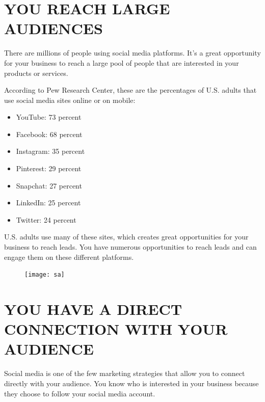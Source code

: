 \documentclass[a4paper]{article}
\begin{document}
 \cleardoublepage
  
  \tableofcontents
  \thispagestyle{empty}
  \cleardoublepage
  
  \setcounter{page}{1}  
  
  \section{ YOU REACH LARGE AUDIENCES}
There are millions of people using social media platforms. It’s a great opportunity for your business to reach a large pool of people that are interested in your products or services.

According to Pew Research Center, these are the percentages of U.S. adults that use social media sites online or on mobile:
 \begin{itemize}
  \item YouTube: 73 percent
  \item Facebook: 68 percent
 \item Instagram: 35 percent
 \item Pinterest: 29 percent
 \item Snapchat: 27 percent
 \item LinkedIn: 25 percent
 \item Twitter: 24 percent
 \end{itemize}
 U.S. adults use many of these sites, which creates great opportunities for your business to reach leads. You have numerous opportunities to reach leads and can engage them on these different platforms.
 \begin{figure}[h]
 \centering
 \texttt{[image: sa]}
 \end{figure}
 \section{ YOU HAVE A DIRECT CONNECTION WITH YOUR AUDIENCE}
 Social media is one of the few marketing strategies that allow you to connect directly with your audience. You know who is interested in your business because they choose to follow your social media account.
\end{document}
